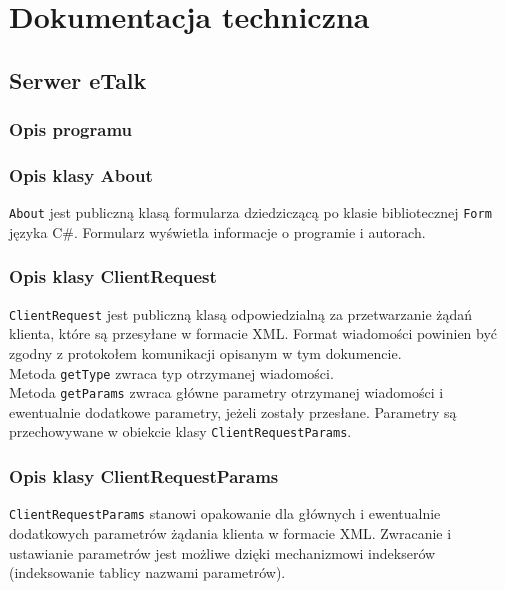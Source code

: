 \documentclass[a4paper,12pt]{article}
\begin{document}
\section[Dokumentacja techniczna]{Dokumentacja techniczna}
\subsection[Serwer eTalk]{Serwer eTalk}
\subsubsection[Opis programu]{Opis programu}

\subsubsection[Opis klasy About]{Opis klasy About}
\texttt{About} jest publiczną klasą formularza dziedziczącą po klasie bibliotecznej \texttt{Form}
języka C\#. Formularz wyświetla informacje o programie i autorach.

\subsubsection[Opis klasy ClientRequest]{Opis klasy ClientRequest}
\texttt{ClientRequest} jest publiczną klasą odpowiedzialną za przetwarzanie żądań klienta, które są przesyłane w formacie XML.
Format wiadomości powinien być zgodny z protokołem komunikacji opisanym w tym dokumencie.\\
Metoda \texttt{getType} zwraca typ otrzymanej wiadomości.\\
Metoda \texttt{getParams} zwraca główne parametry otrzymanej wiadomości i ewentualnie dodatkowe parametry, jeżeli zostały przesłane. Parametry są przechowywane w obiekcie klasy \texttt{ClientRequestParams}.

\subsubsection[Opis klasy ClientRequestParams]{Opis klasy ClientRequestParams}
\texttt{ClientRequestParams} stanowi opakowanie dla głównych i ewentualnie dodatkowych parametrów żądania klienta w formacie XML. Zwracanie i ustawianie parametrów jest możliwe dzięki mechanizmowi indekserów (indeksowanie tablicy nazwami parametrów).
\end{document}
